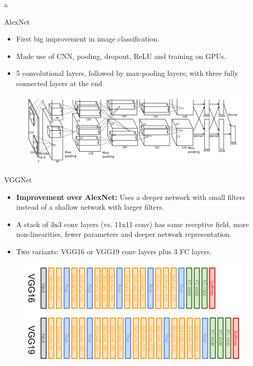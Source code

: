 a\documentclass[10pt]{beamer}
\theoremstyle{remark}
\theoremstyle{definition}
\begin{document}
\begin{frame}{AlexNet}
\begin{itemize}
    \item First big improvement in image classification.
    \item Made use of CNN, pooling, dropout, ReLU and training on GPUs.
    \item 5 convolutional layers, followed by max-pooling layers; with three fully connected layers at the end

\end{itemize}

\begin{figure}
\centering
\includegraphics[width=1.0\textwidth,height=0.5\textheight,keepaspectratio]{./images/alexnet.png}
\end{figure}
    
\end{frame}

\begin{frame}{VGGNet}
\begin{itemize}
    \item \textbf{Improvement over AlexNet:} Uses a deeper network with small filters instead of a shallow network with larger filters.
    \item A stack of 3x3 conv layers (vs. 11x11 conv) has same receptive field, more non-linearities, fewer parameters and deeper network representation.
    \item Two variants: VGG16 or VGG19 conv layers plus 3 FC layers.
\end{itemize}

\begin{figure}
\centering
\includegraphics[width=1.0\textwidth,height=0.5\textheight,keepaspectratio]{./images/VGG_16_19.png}
\end{figure}
    
\end{frame}
\end{document}
